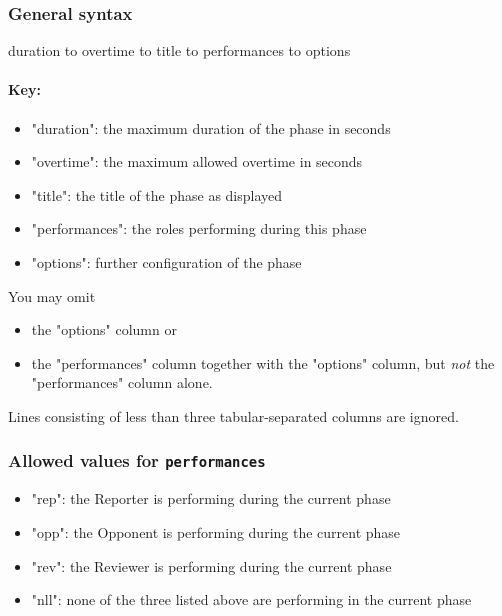 \documentclass[11pt]{ltxdoc}
\newlength{\ccharwidth}
\def\tab{\hbox to \ccharwidth {{\rmfamily\small\mapsto}}}
\begin{document}
    
    \subsubsection*{General syntax}
    \begin{center}\ttfamily
        duration  \tab overtime  \tab title  \tab performances  \tab options
    \end{center}
    
    \paragraph{Key:}
    \begin{itemize}
        \item "duration": the maximum duration of the phase in seconds
        \item "overtime": the maximum allowed overtime in seconds
        \item "title": the title of the phase as displayed
        \item "performances": the roles performing during this phase
        \item "options": further configuration of the phase
    \end{itemize}

    \medskip
    You may omit
    \begin{itemize}
        \item
            the "options" column or
        \item
            the "performances" column together with the "options" column, but \textit{not} the "performances" column alone.
    \end{itemize}
    
    \smallskip
    Lines consisting of less than three tabular-separated columns are ignored.

    
    \subsubsection*{Allowed values for \texttt{performances}}
    \begin{itemize}
        \item "rep": the Reporter is performing during the current phase
        \item "opp": the Opponent is performing during the current phase
        \item "rev": the Reviewer is performing during the current phase
        \item "nll": none of the three listed above are performing in the current phase
    \end{itemize}
\end{document}
